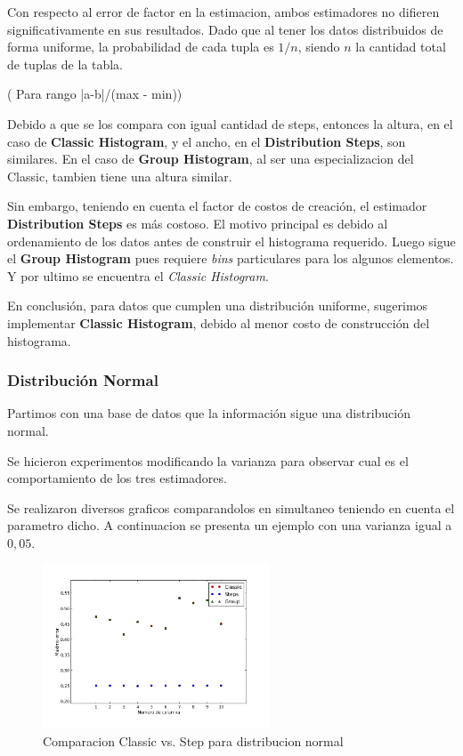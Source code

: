 \documentclass[10pt, a4paper,english,spanish,hidelinks]{article}
\begin{document}
Con respecto al error de factor en la estimacion, ambos estimadores no difieren
significativamente en sus resultados. Dado que al tener los datos distribuidos de forma
uniforme, la probabilidad de cada tupla es $1/n$, siendo $n$ la cantidad total de tuplas de la tabla.

( Para rango |a-b|/(max - min))


Debido a que se los compara con igual cantidad de steps, entonces la altura, en el caso de
\textbf{Classic Histogram}, y el ancho, en el \textbf{Distribution Steps}, son similares.
En el caso de \textbf{Group Histogram}, al ser una especializacion del Classic, tambien tiene
una altura similar.

Sin embargo, teniendo en cuenta el factor de costos de creación, el estimador
\textbf{Distribution Steps} es más costoso. El motivo principal es debido al ordenamiento
de los datos antes de construir el histograma requerido. Luego sigue el \textbf{Group Histogram}
pues requiere \textit{bins} particulares para los algunos elementos. Y por ultimo se encuentra el \textit{Classic Histogram}.

En conclusión, para datos que cumplen una distribución uniforme, sugerimos implementar
\textbf{Classic Histogram}, debido al menor costo de construcción del histograma.


\subsubsection{Distribución Normal}

Partimos con una base de datos que la información sigue una distribución normal.

Se hicieron experimentos modificando la varianza para observar cual es el comportamiento de los tres estimadores.

Se realizaron diversos graficos comparandolos en simultaneo teniendo en cuenta el parametro dicho.
A continuacion se presenta un ejemplo con una varianza igual a $0,05$. 

\begin{figure}[h!]
  \centering
  \includegraphics[width=0.6\textwidth]{./imagenes/ejb2_normal_t_005.png}
  \caption{Comparacion Classic vs. Step para distribucion normal}
\end{figure}
\end{document}
